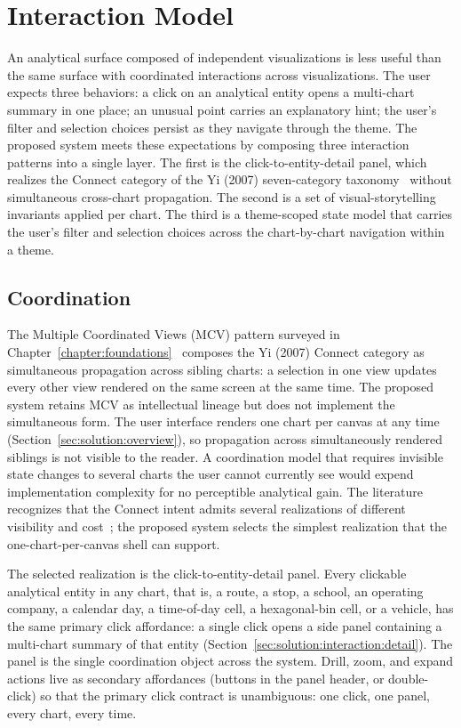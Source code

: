 \section{Interaction Model}
\label{sec:solution:interaction}

An analytical surface composed of independent visualizations is less
useful than the same surface with coordinated interactions across
visualizations. The user expects three behaviors: a click on an
analytical entity opens a multi-chart summary in one place; an unusual
point carries an explanatory hint; the user's filter and selection
choices persist as they navigate through the theme. The proposed
system meets these expectations by composing three interaction
patterns into a single layer. The first is the click-to-entity-detail
panel, which realizes the Connect category of the Yi (2007)
seven-category taxonomy~\cite{yi2007interaction} without simultaneous
cross-chart propagation. The second is a set of visual-storytelling
invariants applied per chart. The third is a theme-scoped state model
that carries the user's filter and selection choices across the
chart-by-chart navigation within a theme.

\subsection{Coordination}
\label{sec:solution:interaction:mcv}

The Multiple Coordinated Views (MCV) pattern surveyed in
Chapter~\ref{chapter:foundations}~\cite{liu2022} composes the Yi (2007)
Connect category as simultaneous propagation across sibling charts: a
selection in one view updates every other view rendered on the same
screen at the same time. The proposed system retains MCV as
intellectual lineage but does not implement the simultaneous form. The
user interface renders one chart per canvas at any time
(Section~\ref{sec:solution:overview}), so propagation across
simultaneously rendered siblings is not visible to the reader. A
coordination model that requires invisible state changes to several
charts the user cannot currently see would expend implementation
complexity for no perceptible analytical gain. The literature
recognizes that the Connect intent admits several realizations of
different visibility and
cost~\cite{heer2012interactive,yi2007interaction}; the proposed system
selects the simplest realization that the one-chart-per-canvas shell
can support.

The selected realization is the click-to-entity-detail panel. Every
clickable analytical entity in any chart, that is, a route, a stop, a
school, an operating company, a calendar day, a time-of-day cell, a
hexagonal-bin cell, or a vehicle, has the same primary click
affordance: a single click opens a side panel containing a
multi-chart summary of that entity
(Section~\ref{sec:solution:interaction:detail}). The panel is the
single coordination object across the system. Drill, zoom, and expand
actions live as secondary affordances (buttons in the panel header, or
double-click) so that the primary click contract is unambiguous: one
click, one panel, every chart, every time.

